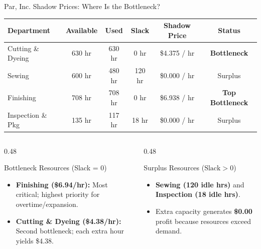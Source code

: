 \documentclass{beamer}
\begin{document}
\begin{frame}{Par, Inc. Shadow Prices: Where Is the Bottleneck?}
\begin{table}[h]
\centering
\footnotesize
\renewcommand{\arraystretch}{1.15}
\setlength{\tabcolsep}{4pt}
\begin{tabular}{lccccc}
\hline
\textbf{Department} & \textbf{Available} & \textbf{Used} & \textbf{Slack} & \textbf{Shadow Price} & \textbf{Status} \\
\hline
Cutting \& Dyeing   & 630 hr & 630 hr & 0 hr   & \$4.375 / hr  & \alert{\textbf{Bottleneck}} \\
Sewing              & 600 hr & 480 hr & 120 hr & \$0.000 / hr  & Surplus \\
Finishing           & 708 hr & 708 hr & 0 hr   & \$6.938 / hr  & \alert{\textbf{Top Bottleneck}} \\
Inspection \& Pkg   & 135 hr & 117 hr & 18 hr  & \$0.000 / hr  & Surplus \\
\hline
\end{tabular}
\end{table}

\vspace{-0.3em}
\begin{columns}[T]
\begin{column}{0.48\textwidth}
\begin{alertblock}{Bottleneck Resources (Slack = 0)}
\small
\begin{itemize}\setlength{\itemsep}{0.2em}
  \item \textbf{Finishing (\$6.94/hr):} Most critical; highest priority for overtime/expansion.
  \item \textbf{Cutting \& Dyeing (\$4.38/hr):} Second bottleneck; each extra hour yields \$4.38.
\end{itemize}
\end{alertblock}
\end{column}

\begin{column}{0.48\textwidth}
\begin{exampleblock}{Surplus Resources ($\text{Slack} > 0$)}
\small
\begin{itemize}\setlength{\itemsep}{0.2em}
  \item \textbf{Sewing (120 idle hrs)} and \textbf{Inspection (18 idle hrs)}.
  \item Extra capacity generates \textbf{\$0.00} profit because resources exceed demand.
\end{itemize}
\end{exampleblock}
\end{column}
\end{columns}
\end{frame}
\end{document}
